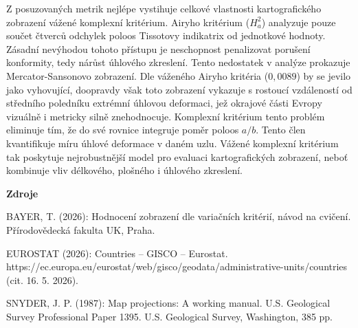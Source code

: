 \documentclass[12pt]{article}
\begin{document}
Z posuzovaných metrik nejlépe vystihuje celkové vlastnosti kartografického zobrazení vážené komplexní kritérium. Airyho kritérium ($H^2_a$) analyzuje pouze součet čtverců odchylek poloos Tissotovy indikatrix od jednotkové hodnoty. Zásadní nevýhodou tohoto přístupu je neschopnost penalizovat porušení konformity, tedy nárůst úhlového zkreslení. Tento nedostatek v analýze prokazuje Mercator-Sansonovo zobrazení. Dle váženého Airyho kritéria ($0,0089$) by se jevilo jako vyhovující, doopravdy však toto zobrazení vykazuje s rostoucí vzdáleností od středního poledníku extrémní úhlovou deformaci, jež okrajové části Evropy vizuálně i metricky silně znehodnocuje. Komplexní kritérium tento problém eliminuje tím, že do své rovnice integruje poměr poloos $a/b$. Tento člen kvantifikuje míru úhlové deformace v daném uzlu. Vážené komplexní kritérium tak poskytuje nejrobustnější model pro evaluaci kartografických zobrazení, neboť kombinuje vliv délkového, plošného i úhlového zkreslení.

\newpage
{\large \textbf {Zdroje}}

BAYER, T. (2026): Hodnocení zobrazení dle variačních kritérií, návod na cvičení. Přírodovědecká fakulta UK, Praha.

EUROSTAT (2026): Countries – GISCO – Eurostat. \\ https://ec.europa.eu/eurostat/web/gisco/geodata/administrative-units/countries \\
(cit. 16. 5. 2026).

SNYDER, J. P. (1987): Map projections: A working manual. U.S. Geological Survey Professional Paper 1395. U.S. Geological Survey, Washington, 385 pp.
\end{document}
